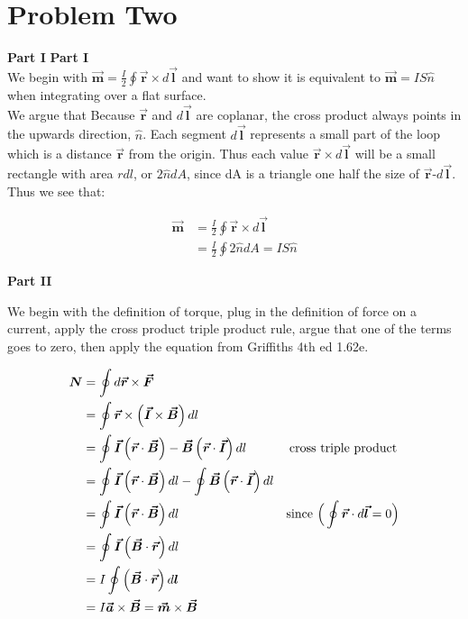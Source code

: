 \documentclass[10pt]{article} %
\newcommand{\bv}[1]{\boldsymbol{\vec{#1}}}
\begin{document}
\section{Problem Two}
\textbf{Part I}
\textbf{Part I}\\

We begin with $\bv{m} = \frac{I}{2}\oint \bv{r} \times d\bv{l}$ and want to show it is equivalent to $\bv{m} = IS\hat{n}$ when integrating over a flat surface.\\

We argue that Because $\bv{r}$ and $d\bv{l}$ are coplanar, the cross product always points in the upwards direction, $\hat{n}$. Each segment $d\bv{l}$ represents a small part of the loop which is a distance $\bv{r}$ from the origin. Thus each value $\bv{r} \times d\bv{l}$ will be a small rectangle with area $rdl$, or $2\hat{n}dA$, since dA is a triangle one half the size of $\bv{r}$-$d\bv{l}$.\\

Thus we see that:

\begin{align*}
	\bv{m} &= \frac{I}{2}\oint \bv{r} \times d\bv{l}\\
	&= \frac{I}{2} \oint 2\hat{n}dA = IS\hat{n}
\end{align*}

\textbf{Part II}

We begin with the definition of torque, plug in the definition of force on a current, apply the cross product triple product rule,
argue that one of the terms goes to zero, then apply the equation from Griffiths 4th ed 1.62e.

\begin{align*}
  \boldsymbol{N} &= \oint d\bv{r} \times \bv{F}\\
  &= \oint \bv{r} \times \left(\bv{I} \times \bv{B}\right)dl\\
  &= \oint \bv{I}\left(\bv{r} \cdot \bv{B}\right) - \bv{B}\left(\bv{r} \cdot \bv{I}\right)dl \hspace{1.2cm}\mbox{cross triple product}\\
  &= \oint \bv{I}\left(\bv{r} \cdot \bv{B}\right)dl - \oint\bv{B}\left(\bv{r} \cdot \bv{I}\right)dl\\
  &= \oint \bv{I}\left(\bv{r} \cdot \bv{B}\right)dl \hspace{3cm}\mbox{since }\Big(\oint \bv{r} \cdot d\bv{l} = 0\Big)\\
  &= \oint \bv{I}\left(\bv{B} \cdot \bv{r}\right)dl\\
  &= I\oint \left(\bv{B} \cdot \bv{r}\right)d\boldsymbol{l}\\
  &= I\bv{a} \times \bv{B} = \bv{m} \times \bv{B}\\
\end{align*}
\end{document}
